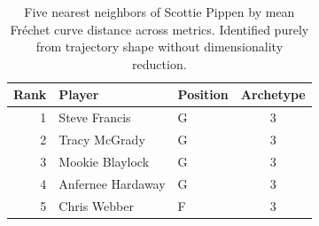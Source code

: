 \begin{table}[htbp]
  \centering\small
  \begin{tabular}{rllc}
    \toprule
    Rank & Player & Position & Archetype \\
    \midrule
    1 & Steve Francis & G & 3 \\
    2 & Tracy McGrady & G & 3 \\
    3 & Mookie Blaylock & G & 3 \\
    4 & Anfernee Hardaway & G & 3 \\
    5 & Chris Webber & F & 3 \\
    \bottomrule
  \end{tabular}
  \caption{Five nearest neighbors of Scottie Pippen by mean Fr\'{e}chet curve distance across metrics. Identified purely from trajectory shape without dimensionality reduction.}
  \label{tab:Scottie_Pippen_frechet_curve_neighbors}
\end{table}

